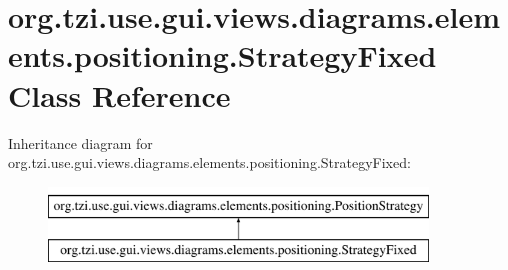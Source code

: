 \hypertarget{classorg_1_1tzi_1_1use_1_1gui_1_1views_1_1diagrams_1_1elements_1_1positioning_1_1_strategy_fixed}{\section{org.\-tzi.\-use.\-gui.\-views.\-diagrams.\-elements.\-positioning.\-Strategy\-Fixed Class Reference}
\label{classorg_1_1tzi_1_1use_1_1gui_1_1views_1_1diagrams_1_1elements_1_1positioning_1_1_strategy_fixed}
}
Inheritance diagram for org.\-tzi.\-use.\-gui.\-views.\-diagrams.\-elements.\-positioning.\-Strategy\-Fixed\-:\begin{figure}[H]
\begin{center}
\leavevmode
\includegraphics[height=2.000000cm]{classorg_1_1tzi_1_1use_1_1gui_1_1views_1_1diagrams_1_1elements_1_1positioning_1_1_strategy_fixed}
\end{center}
\end{figure}
